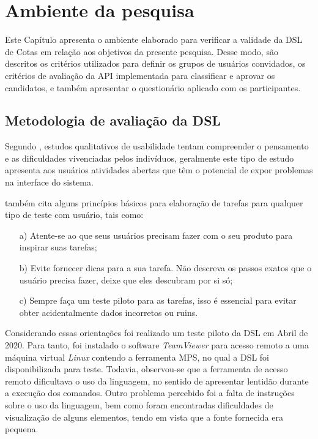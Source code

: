 \section{Ambiente da pesquisa}
\label{ambiente}
 Este Capítulo apresenta o ambiente elaborado para verificar a validade da DSL de Cotas em relação aos objetivos da presente pesquisa. Desse modo, são descritos os critérios utilizados para definir os grupos de usuários convidados, os critérios de avaliação da \gls{API} implementada para classificar e aprovar os candidatos, e também apresentar o questionário aplicado com os participantes.
 
\subsection{Metodologia de avaliação da DSL}
\label{metododsl}

 Segundo , estudos qualitativos de usabilidade tentam compreender o pensamento e as dificuldades vivenciadas pelos indivíduos, geralmente este tipo de estudo apresenta aos usuários atividades abertas que têm o potencial de expor problemas na interface do sistema. 
 
  também cita alguns princípios básicos para elaboração de tarefas para qualquer tipo de teste com usuário, tais como:
 
 \begin{enumerate}
    \item[a)] Atente-se ao que seus usuários precisam fazer com o seu produto para inspirar suas tarefas;
    \item[b)] Evite fornecer dicas para a sua tarefa. Não descreva os passos exatos que o usuário precisa fazer, deixe que eles descubram por si só;
    \item[c)] Sempre faça um teste piloto para as tarefas, isso é essencial para evitar obter acidentalmente dados incorretos ou ruins.
    
\end{enumerate}
 
 Considerando essas orientações foi realizado um teste piloto da \gls{DSL} em Abril de 2020. Para tanto, foi instalado o software \textit{TeamViewer} para acesso remoto a uma máquina virtual \textit{Linux} contendo a ferramenta \gls{MPS}, no qual a DSL foi disponibilizada para teste. Todavia, observou-se que a ferramenta de acesso remoto dificultava o uso da linguagem, no sentido de apresentar lentidão durante a execução dos comandos. Outro problema percebido foi a falta de instruções sobre o uso da linguagem, bem como foram encontradas dificuldades de visualização de alguns elementos, tendo em vista que a fonte fornecida era pequena.
 

